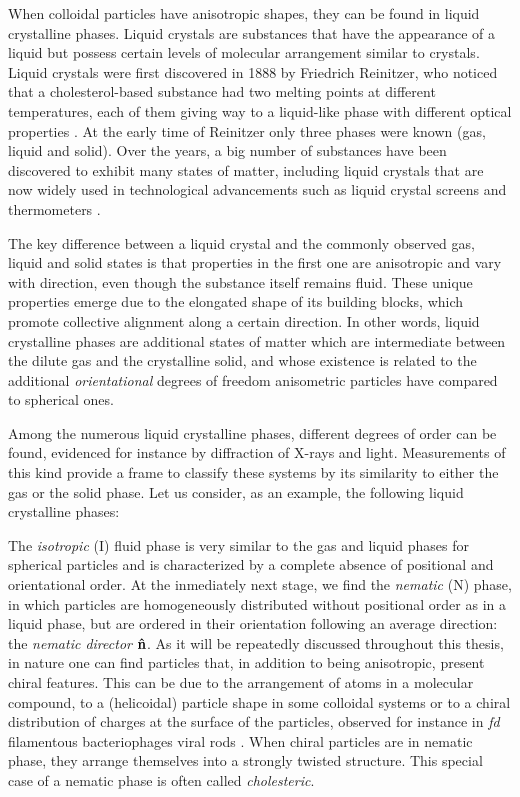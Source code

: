 When colloidal particles have anisotropic shapes, they can be found in liquid crystalline phases. Liquid crystals are substances that have the appearance of a liquid but possess certain levels of molecular arrangement similar to crystals. Liquid crystals were first discovered in 1888 by Friedrich Reinitzer, who noticed that a cholesterol-based substance had two melting points at different temperatures, each of them giving way to a liquid-like phase with different optical properties \cite{reinitzer1888beitrage}. At the early time of Reinitzer only three phases were known (gas, liquid and solid). Over the years, a big number of substances have been discovered to exhibit many states of matter, including liquid crystals that are now widely used in technological advancements such as liquid crystal screens and thermometers \cite{Li_2012}.

The key difference between a liquid crystal and the commonly observed gas, liquid and solid states is that properties in the first one are anisotropic and vary with direction, even though the substance itself remains fluid. These unique properties emerge due to the elongated shape of its building blocks, which promote collective alignment along a certain direction. In other words, liquid crystalline phases are additional states of matter which are intermediate between the dilute gas and the crystalline solid, and whose existence is related to the additional {\em orientational} degrees of freedom anisometric particles have compared to spherical ones.

Among the numerous liquid crystalline phases, different degrees of order can be found, evidenced for instance by diffraction of X-rays and light. Measurements of this kind provide a frame to classify these systems by its similarity to either the gas or the solid phase. Let us consider, as an example, the following liquid crystalline phases:

The {\em isotropic} (I) fluid phase is very similar to the gas and liquid phases for spherical particles and is characterized by a complete absence of positional and orientational order. At the inmediately next stage, we find the {\em nematic} (N) phase, in which particles are homogeneously distributed without positional order as in a liquid phase, but are ordered in their orientation following an average direction: the {\em nematic director} ${\bf \hat{n}}$. As it will be repeatedly discussed throughout this thesis, in nature one can find particles that, in addition to being anisotropic, present chiral features. This can be due to the arrangement of atoms in a molecular compound, to a (helicoidal) particle shape in some colloidal systems or to a chiral distribution of charges at the surface of the particles, observed for instance in {\em fd} filamentous bacteriophages viral rods \cite{Gibaud_2017}. When chiral particles are in nematic phase, they arrange themselves into a strongly twisted structure. This special case of a nematic phase is often called {\em cholesteric}.

